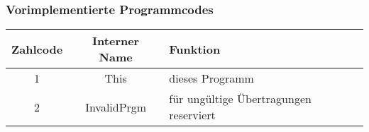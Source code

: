 \subsubsection*{Vorimplementierte Programmcodes}
\begin{tabular}{|c|c|l|}
\hline
Zahlcode & Interner Name & Funktion\\\hline
1 & This & dieses Programm\\\hline
2 & InvalidPrgm & für ungültige Übertragungen reserviert\\\hline
\end{tabular}